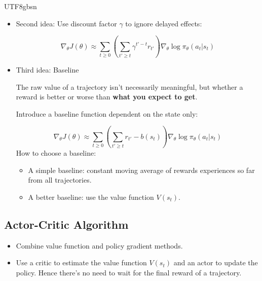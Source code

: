 \documentclass{article}
\numberwithin{equation}{section}
\begin{document}
\begin{CJK}{UTF8}{gbsn}
\begin{enumerate}
\begin{itemize}
        \item Second idea: Use discount factor $\gamma$ to ignore delayed effects:\par
        \begin{equation*}
            \nabla_\theta J(\theta) \approx \sum_{t \geq 0} \left( \sum_{t' \geq t} \gamma^{t' - t} r_{t'} \right) \nabla_\theta \log \pi_\theta(a_t | s_t)
        \end{equation*}

        \item Third idea: Baseline\par
        The raw value of a trajectory isn't necessarily meaningful, but whether a reward is better or worse than \textbf{what you expect to get}.\par
        Introduce a baseline function dependent on the state only:\par
        \begin{equation*}
            \nabla_\theta J(\theta) \approx \sum_{t \geq 0} \left( \sum_{t' \geq t} r_{t'} - b(s_t) \right) \nabla_\theta \log \pi_\theta(a_t | s_t)
        \end{equation*}
        How to choose a baseline:\par
        \begin{itemize}
            \item A simple baseline: constant moving average of rewards experiences so far from all trajectories.\par
            \item A better baseline: use the value function \(V(s_t)\).
        \end{itemize}
    \end{itemize}
\end{enumerate}

\subsection{Actor-Critic Algorithm}
\begin{itemize}
    \item Combine value function and policy gradient methods.
    \item Use a critic to estimate the value function \(V(s_t)\) and an actor to update the policy. Hence there's no need to wait for the final reward of a trajectory.
\end{itemize}


\end{CJK}
\end{document}

